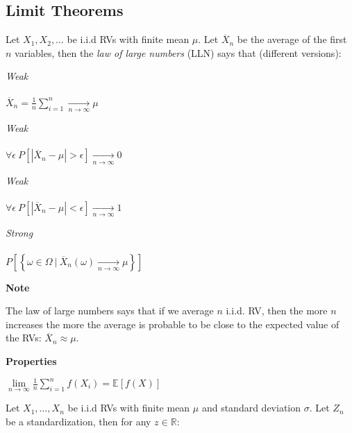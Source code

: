 \documentclass[8pt,a4paper]{extarticle}     %
\newcommand{\R}{\mathbb{R}}
\newcommand{\limcont}[3]{\lim\limits_{#1 \rightarrow #2}{#3}}
\begin{document}
\begin{multicols}{4}
\subsection{Limit Theorems}
\begin{boxtheorem} 
	Let $X_1,X_2,\dots$ be i.i.d RVs with finite mean $\mu$. Let $\overline{X}_n$ be the average of the first $n$ variables, then the \textit{law of large numbers} (LLN) says that (different versions): 
	\begin{listnr}
		\item \textit{Weak }\\ \\ 
		$\displaystyle\overline{X}_n=\frac{1}{n}\sum_{i=1}^{n}\xrightarrow[n\rightarrow\infty]{} \mu$
		\item \textit{Weak }\\ \\
		$\displaystyle \forall \epsilon \ P\left[\left\lvert \overline{X}_n-\mu\right\rvert>\epsilon \right] \xrightarrow[n\rightarrow\infty]{} 0$
		\item \textit{Weak }\\ \\ 
		$\displaystyle \forall \epsilon \ P\left[\left\lvert \overline{X}_n -\mu\right\rvert < \epsilon\right] \xrightarrow[n\rightarrow\infty]{} 1$
		\item \textit{Strong }\\ \\ 
		$\displaystyle P\left[\left\{\omega\in\Omega \ \vert \ \overline{X}_n(\omega)\xrightarrow[n\rightarrow\infty]{} \mu \right\}\right]$
		\end{listnr}
\end{boxtheorem}
\begin{listb}
	\item [] \textbf{Note}
	\item The law of large numbers says that if we average $n$ i.i.d. RV, then the more $n$ increases the more the average is probable to be close to the expected value of the RVs: $\overline{X}_n\approx\mu$. 
	\item [] \textbf{Properties}
	\item $\limcont{n}{\infty}{\frac{1}{n}\sum_{i=1}^{n}f(X_i)}=\mathbb{E}\left[f(X)\right]$ 
\end{listb}
\begin{boxtheorem} 
	Let $X_1,\dots,X_n$ be i.i.d RVs with finite mean $\mu$ and standard deviation $\sigma$. Let $Z_n$ be a standardization, then for any $z\in\R$:
	\[
\]
\end{boxtheorem}
\end{multicols}
\end{document}
